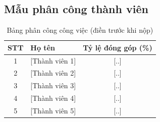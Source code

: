 \subsection{Mẫu phân công thành viên}
\begin{table}[H]
\centering
\caption{Bảng phân công công việc (điền trước khi nộp)}
\begin{tabular}{clc}
\toprule
\textbf{STT} & \textbf{Họ tên} & \textbf{Tỷ lệ đóng góp (\%)} \\
\midrule
1 & [Thành viên 1] & [..] \\
2 & [Thành viên 2] & [..] \\
3 & [Thành viên 3] & [..] \\
4 & [Thành viên 4] & [..] \\
5 & [Thành viên 5] & [..] \\
\bottomrule
\end{tabular}
\end{table}
